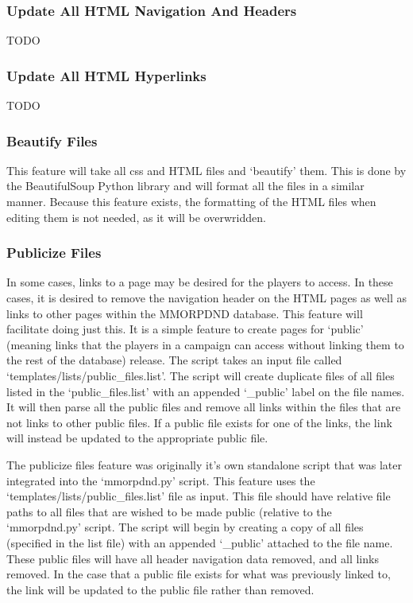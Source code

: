 \subsubsection{Update All HTML Navigation And Headers}

TODO

\subsubsection{Update All HTML Hyperlinks}

TODO

\subsubsection{Beautify Files}

This feature will take all css and HTML files and `beautify' them. This is done by the BeautifulSoup Python library and will format all the files in a similar manner. Because this feature exists, the formatting of the HTML files when editing them is not needed, as it will be overwridden.   

\subsubsection{Publicize Files}

In some cases, links to a page may be desired for the players to access. In these cases, it is desired to remove the navigation header on the HTML pages as well as links to other pages within the MMORPDND database. This feature will facilitate doing just this. It is a simple feature to create pages for `public' (meaning links that the players in a campaign can access without linking them to the rest of the database) release. The script takes an input file called `templates/lists/public\_files.list'. The script will create duplicate files of all files listed in the `public\_files.list' with an appended `\_public' label on the file names. It will then parse all the public files and remove all links within the files that are not links to other public files. If a public file exists for one of the links, the link will instead be updated to the appropriate public file. 

The publicize files feature was originally it's own standalone script that was later integrated into the `mmorpdnd.py' script. This feature uses the `templates/lists/public\_files.list' file as input. This file should have relative file paths to all files that are wished to be made public (relative to the `mmorpdnd.py' script. The script will begin by creating a copy of all files (specified in the list file) with an appended `\_public' attached to the file name. These public files will have all header navigation data removed, and all links removed. In the case that a public file exists for what was previously linked to, the link will be updated to the public file rather than removed.










